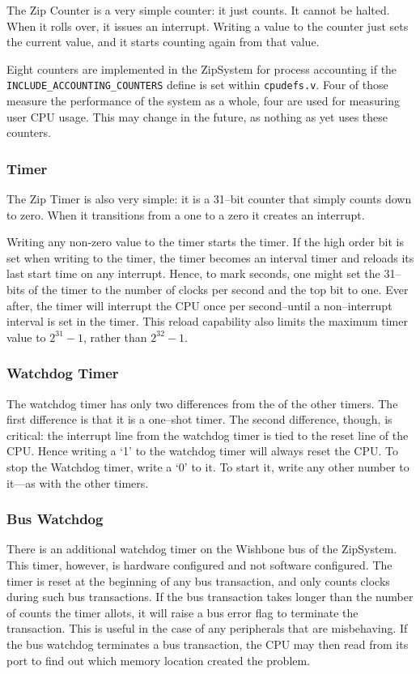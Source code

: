 \documentclass{gqtekspec}
\begin{document}
The Zip Counter is a very simple counter: it just counts.  It cannot be
halted.  When it rolls over, it issues an interrupt.  Writing a value to the
counter just sets the current value, and it starts counting again from that
value.

Eight counters are implemented in the ZipSystem for process accounting if
the {\tt INCLUDE\_ACCOUNTING\_COUNTERS} define is set within {\tt cpudefs.v}.
Four of those measure the performance of the system as a whole, four are
used for measuring user CPU usage.
This may change in the future, as nothing as yet uses these counters.

\subsubsection{Timer}

The Zip Timer is also very simple: it is a 31--bit counter that simply counts
down to zero.  When it transitions from a one to a zero it creates an interrupt.

Writing any non-zero value to the timer starts the timer.  If the high order
bit is set when writing to the timer, the timer becomes an interval timer and
reloads its last start time on any interrupt.  Hence, to mark seconds, one
might set the 31--bits of the timer to the number of clocks per second and the
top bit to one.  Ever after, the timer will interrupt the CPU once per
second--until a non--interrupt interval is set in the timer.  This reload
capability also limits the maximum timer value to $2^{31}-1$, rather than
$2^{32}-1$.

\subsubsection{Watchdog Timer}

The watchdog timer has only two differences from the of the other timers.
The first difference is that it is a one--shot timer.  The second difference,
though, is critical: the interrupt line from the watchdog timer is tied to the
reset line of the CPU.  Hence writing a `1' to the watchdog timer will always
reset the CPU.  To stop the Watchdog timer, write a `0' to it.  To start it,
write any other number to it---as with the other timers.


\subsubsection{Bus Watchdog}
There is an additional watchdog timer on the Wishbone bus of the ZipSystem. 
This timer,
however, is hardware configured and not software configured.  The timer is
reset at the beginning of any bus transaction, and only counts clocks during
such bus transactions.  If the bus transaction takes longer than the number
of counts the timer allots, it will raise a bus error flag to terminate the
transaction.  This is useful in the case of any peripherals that are
misbehaving.  If the bus watchdog terminates a bus transaction, the CPU may
then read from its port to find out which memory location created the problem.
\end{document}
